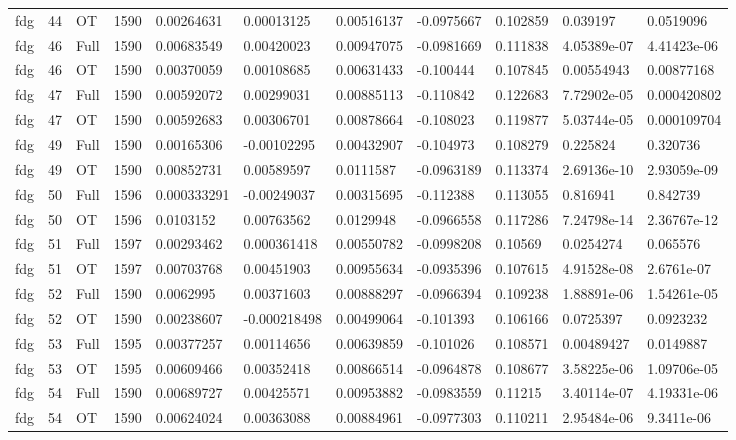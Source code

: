 \begin{landscape}
\begin{longtable}{lllllllllll}
fdg & 44 & OT & 1590 & 0.00264631 & 0.00013125 & 0.00516137 & -0.0975667 & 0.102859 & 0.039197 & 0.0519096 \\
fdg & 46 & Full & 1590 & 0.00683549 & 0.00420023 & 0.00947075 & -0.0981669 & 0.111838 & 4.05389e-07 & 4.41423e-06 \\
fdg & 46 & OT & 1590 & 0.00370059 & 0.00108685 & 0.00631433 & -0.100444 & 0.107845 & 0.00554943 & 0.00877168 \\
fdg & 47 & Full & 1590 & 0.00592072 & 0.00299031 & 0.00885113 & -0.110842 & 0.122683 & 7.72902e-05 & 0.000420802 \\
fdg & 47 & OT & 1590 & 0.00592683 & 0.00306701 & 0.00878664 & -0.108023 & 0.119877 & 5.03744e-05 & 0.000109704 \\
fdg & 49 & Full & 1590 & 0.00165306 & -0.00102295 & 0.00432907 & -0.104973 & 0.108279 & 0.225824 & 0.320736 \\
fdg & 49 & OT & 1590 & 0.00852731 & 0.00589597 & 0.0111587 & -0.0963189 & 0.113374 & 2.69136e-10 & 2.93059e-09 \\
fdg & 50 & Full & 1596 & 0.000333291 & -0.00249037 & 0.00315695 & -0.112388 & 0.113055 & 0.816941 & 0.842739 \\
fdg & 50 & OT & 1596 & 0.0103152 & 0.00763562 & 0.0129948 & -0.0966558 & 0.117286 & 7.24798e-14 & 2.36767e-12 \\
fdg & 51 & Full & 1597 & 0.00293462 & 0.000361418 & 0.00550782 & -0.0998208 & 0.10569 & 0.0254274 & 0.065576 \\
fdg & 51 & OT & 1597 & 0.00703768 & 0.00451903 & 0.00955634 & -0.0935396 & 0.107615 & 4.91528e-08 & 2.6761e-07 \\
fdg & 52 & Full & 1590 & 0.0062995 & 0.00371603 & 0.00888297 & -0.0966394 & 0.109238 & 1.88891e-06 & 1.54261e-05 \\
fdg & 52 & OT & 1590 & 0.00238607 & -0.000218498 & 0.00499064 & -0.101393 & 0.106166 & 0.0725397 & 0.0923232 \\
fdg & 53 & Full & 1595 & 0.00377257 & 0.00114656 & 0.00639859 & -0.101026 & 0.108571 & 0.00489427 & 0.0149887 \\
fdg & 53 & OT & 1595 & 0.00609466 & 0.00352418 & 0.00866514 & -0.0964878 & 0.108677 & 3.58225e-06 & 1.09706e-05 \\
fdg & 54 & Full & 1590 & 0.00689727 & 0.00425571 & 0.00953882 & -0.0983559 & 0.11215 & 3.40114e-07 & 4.19331e-06 \\
fdg & 54 & OT & 1590 & 0.00624024 & 0.00363088 & 0.00884961 & -0.0977303 & 0.110211 & 2.95484e-06 & 9.3411e-06 \\

\end{longtable}
\end{landscape}
